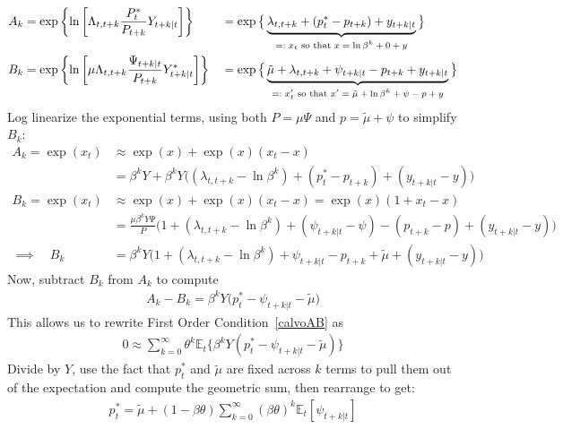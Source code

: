 \documentclass[12pt]{article}
\theoremstyle{plain}
\theoremstyle{definition}
\theoremstyle{remark}
\newcommand{\E}{\mathbb{E}}
\begin{document}
\begin{alignat*}{3}
  A_k
  &= \exp\left\{
    \ln\left[
      \Lambda_{t,t+k}
      \frac{P_t^*}{P_{t+k}}
      Y_{t+k|t}
    \right]
  \right\}
  &&= \exp\big\{
    \underbrace{%
    \lambda_{t,t+k}
    + (p_t^*-p_{t+k})
    + y_{t+k|t}
    }_{\text{$=:x_t$ so that $x=\ln \beta^k+0+y$}}
  \big\}
  \\
  B_k
  &= \exp\left\{
    \ln\left[
      \mu
      \Lambda_{t,t+k}
      \frac{\Psi_{t+k|t}}{P_{t+k}}
      Y_{t+k|t}^*
    \right]
  \right\}
  &&= \exp\big\{
    \underbrace{%
    \tilde{\mu} +
    \lambda_{t,t+k}
    + \psi_{t+k|t} - p_{t+k}
    + y_{t+k|t}
    }_{\text{$=:x'_t$ so that $x'=\tilde{\mu}+\ln \beta^k+\psi-p+y$}}
  \big\}
\end{alignat*}
Log linearize the exponential terms, using both
$P=\mu\Psi$ and $p=\tilde{\mu}+\psi$ to simplify $B_k$:
\begin{align*}
  A_k
  = \exp(x_t)
  &\approx
  \exp(x) + \exp(x)(x_t-x)
  \\
  &=
  \beta^k Y
  +
  \beta^k Y
  \big(
  (\lambda_{t,t+k}-\ln\beta^k)
  + (p_t^*-p_{t+k})
  + (y_{t+k|t}-y)
  \big)
  \\
  B_k
  = \exp(x_t)
  &\approx
  \exp(x) + \exp(x)(x_t-x)
  =
  \exp(x)(1+x_t-x)
  \\
  &=
  \frac{\mu \beta^k Y\Psi}{P}
  \big(
  1 +
  (\lambda_{t,t+k}-\ln\beta^k)
  + (\psi_{t+k|t}-\psi)
  - (p_{t+k}-p)
  + (y_{t+k|t}-y)
  \big)
  \\
  \implies\quad
  B_k
  &=
  \beta^k Y
  \big(
  1+
  (\lambda_{t,t+k}-\ln\beta^k)
  + \psi_{t+k|t}
  - p_{t+k}
  + \tilde{\mu}
  + (y_{t+k|t}-y)
  \big)
\end{align*}
Now, subtract $B_k$ from $A_k$ to compute
\begin{align*}
  A_k - B_k
  =
  \beta^k Y
  \big(
  p_t^* - \psi_{t+k|t}
  - \tilde{\mu}
  \big)
\end{align*}
This allows us to rewrite First Order Condition~\ref{calvoAB} as
\begin{align*}
  0
  \approx
  \sum_{k=0}^\infty
  \theta^k
  \E_t\bigg\{
  \beta^kY
  \left(
  p_t^*
  - \psi_{t+k|t}
  -\tilde{\mu}
  \right)
  \bigg\}
\end{align*}
Divide by $Y$, use the fact that $p_t^*$ and $\tilde{\mu}$ are fixed
across $k$ terms to pull them out of the expectation and compute the
geometric sum, then rearrange to get:
\begin{align*}
  \boxed{
  p_t^*
  =
  \tilde{\mu} +
  (1-\beta\theta)\sum_{k=0}^\infty
  (\beta\theta)^k
  \E_t[ \psi_{t+k|t} ]
  }
\end{align*}
\end{document}
